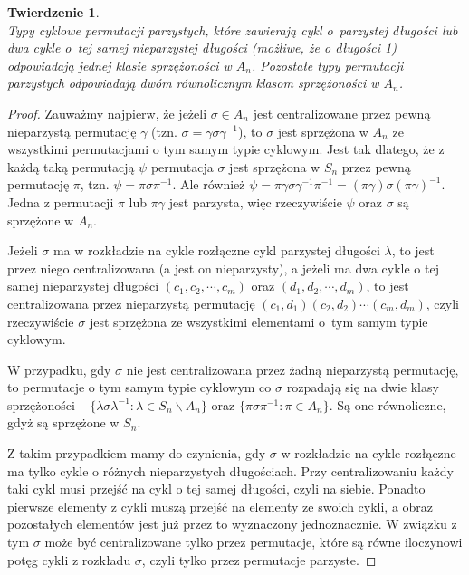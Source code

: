\documentclass[licencjacka]{pracamgr}
\newtheorem{thh}{Twierdzenie}[section]
\begin{document}
\begin{thh}\label{thm_o_klasach_A_n} $ $ \\
    Typy cyklowe permutacji parzystych, które zawierają cykl o~parzystej długości
    lub dwa cykle o~tej samej nieparzystej długości (możliwe, że o długości 1)
    odpowiadają jednej klasie sprzężoności w $A_n$.
    Pozostałe typy permutacji parzystych odpowiadają dwóm równolicznym klasom sprzężoności w $A_n$.
\end{thh}
\begin{proof}
    Zauważmy najpierw, że jeżeli $\sigma \in A_n$ jest centralizowane przez pewną nieparzystą permutację $\gamma$
    (tzn. $\sigma = \gamma \sigma \gamma ^{-1}$),
    to $\sigma$ jest sprzężona w $A_n$ ze wszystkimi permutacjami o tym samym typie cyklowym.
    Jest tak dlatego, że z każdą taką permutacją $\psi$ permutacja $\sigma$ jest sprzężona w $S_n$ przez pewną permutację $\pi$,
    tzn. $\psi = \pi \sigma \pi^{-1}$.
    Ale również $\psi = \pi \gamma \sigma \gamma^{-1} \pi^{-1} = (\pi \gamma) \sigma (\pi \gamma)^{-1}$.
    Jedna z permutacji $\pi$ lub $\pi \gamma$ jest parzysta, więc rzeczywiście $\psi$ oraz $\sigma$ są sprzężone w $A_n$.

    Jeżeli $\sigma$ ma w rozkładzie na cykle rozłączne cykl parzystej długości $\lambda$,
    to jest przez niego centralizowana (a jest on nieparzysty),
    a jeżeli ma dwa cykle o tej samej nieparzystej długości $(c_1, c_2, \cdots, c_m)$ oraz $(d_1, d_2, \cdots, d_m)$,
    to jest centralizowana przez nieparzystą permutację $(c_1, d_1)(c_2, d_2) \cdots (c_m, d_m)$,
    czyli rzeczywiście $\sigma$ jest sprzężona ze wszystkimi elementami o~tym samym typie cyklowym.

    W przypadku, gdy $\sigma$ nie jest centralizowana przez żadną nieparzystą permutację,
    to permutacje o tym samym typie cyklowym co $\sigma$ rozpadają się na dwie klasy sprzężoności --
    $\{\lambda \sigma \lambda^{-1} \colon \lambda \in S_n \backslash A_n \}$ oraz
    $\{\pi \sigma \pi^{-1} \colon \pi \in  A_n \}$.
    Są one równoliczne, gdyż są sprzężone w $S_n$.

    Z takim przypadkiem mamy do czynienia, gdy $\sigma$ w rozkładzie na cykle rozłączne
    ma tylko cykle o różnych nieparzystych długościach.
    Przy centralizowaniu każdy taki cykl musi przejść na cykl o tej samej długości, czyli na siebie.
    Ponadto pierwsze elementy z cykli muszą przejść na elementy ze swoich cykli,
    a obraz pozostałych elementów jest już przez to wyznaczony jednoznacznie.
    W związku z tym $\sigma$ może być centralizowane tylko przez permutacje,
    które są równe iloczynowi potęg cykli z rozkładu $\sigma$,
    czyli tylko przez permutacje parzyste.
\end{proof}
\end{document}
